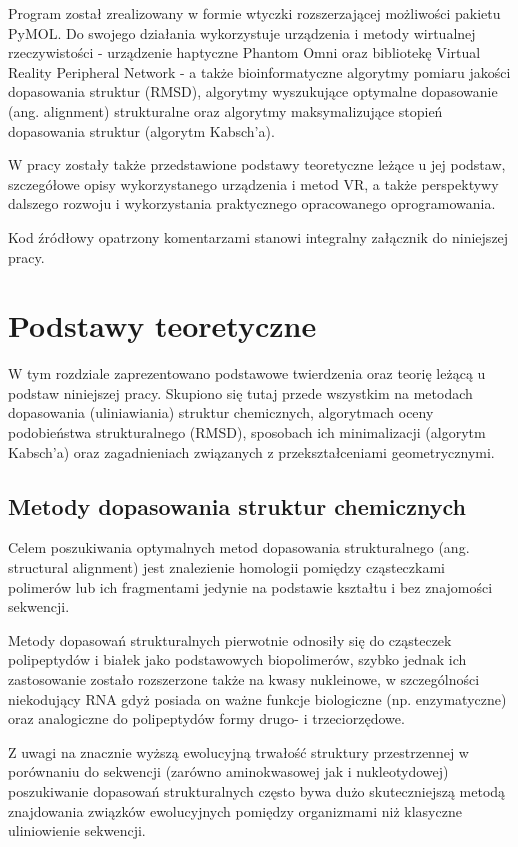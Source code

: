 \documentclass[licencjacka]{pracamgr}
\begin{document}
Program został zrealizowany w formie wtyczki rozszerzającej możliwości pakietu PyMOL. Do swojego działania wykorzystuje urządzenia i metody wirtualnej rzeczywistości - urządzenie haptyczne Phantom Omni oraz bibliotekę Virtual Reality Peripheral Network - a także bioinformatyczne algorytmy pomiaru jakości dopasowania struktur (RMSD), algorytmy wyszukujące optymalne dopasowanie (ang. alignment) strukturalne oraz algorytmy maksymalizujące stopień dopasowania struktur (algorytm Kabsch'a).

W pracy zostały także przedstawione podstawy teoretyczne leżące u jej podstaw, szczegółowe opisy wykorzystanego urządzenia i metod VR, a także perspektywy dalszego rozwoju i wykorzystania praktycznego opracowanego oprogramowania.

Kod źródłowy opatrzony komentarzami stanowi integralny załącznik do niniejszej pracy.

\chapter{Podstawy teoretyczne}
W tym rozdziale zaprezentowano podstawowe twierdzenia oraz teorię leżącą u podstaw niniejszej pracy. Skupiono się tutaj przede wszystkim na metodach dopasowania (uliniawiania) struktur chemicznych, algorytmach oceny podobieństwa strukturalnego (RMSD), sposobach ich minimalizacji (algorytm Kabsch'a) oraz zagadnieniach związanych z przekształceniami geometrycznymi.

\section{Metody dopasowania struktur chemicznych}
Celem poszukiwania optymalnych metod dopasowania strukturalnego (ang. structural alignment) jest znalezienie homologii pomiędzy cząsteczkami polimerów lub ich fragmentami jedynie na podstawie kształtu i bez znajomości sekwencji. 

Metody dopasowań strukturalnych pierwotnie odnosiły się do cząsteczek polipeptydów i białek jako podstawowych biopolimerów, szybko jednak ich zastosowanie zostało rozszerzone także na kwasy nukleinowe, w szczególności niekodujący RNA gdyż posiada on ważne funkcje biologiczne (np. enzymatyczne) oraz analogiczne do polipeptydów formy drugo- i trzeciorzędowe. 

Z uwagi na znacznie wyższą ewolucyjną trwałość struktury przestrzennej w porównaniu do sekwencji (zarówno aminokwasowej jak i nukleotydowej) poszukiwanie dopasowań strukturalnych często bywa dużo skuteczniejszą metodą znajdowania związków ewolucyjnych pomiędzy organizmami niż klasyczne uliniowienie sekwencji. 
\end{document}

